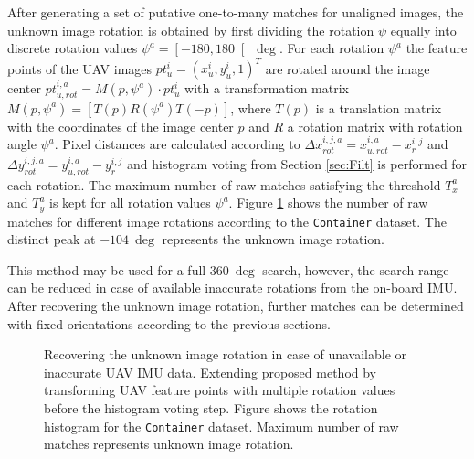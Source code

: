 After generating a set of putative one-to-many matches for unaligned images, the unknown image rotation is obtained by first dividing the rotation $\psi$ equally into discrete rotation values $\psi^a = \left[ -180, 180 \right[ \SI{}{\deg}$.
For each rotation $\psi^a$ the feature points of the UAV images $pt_{u}^i = (x_{u}^i , y_{u}^i , 1)^T$ are rotated around the image center $pt_{u,rot}^{i,a} = M(p,\psi^a) \cdot pt_{u}^i$ with a transformation matrix $M(p,\psi^a) = \left[ T(p) R(\psi^a) T(-p) \right]$, where $T(p)$ is a translation matrix with the coordinates of the image center $p$ and $R$ a rotation matrix with rotation angle $\psi^a$. 
Pixel distances are calculated according to $\Delta x_{rot}^{i,j,a} = x_{u,rot}^{i,a} - x_{r}^{i,j} $ and $ \Delta y_{rot}^{i,j,a} = y_{u,rot}^{i,a} - y_{r}^{i,j}$ and histogram voting from Section \ref{sec:Filt} is performed for each rotation.
The maximum number of raw matches satisfying the threshold $T_{x}^a$ and $T_{y}^a$ is kept for all rotation values $\psi^a$. 
Figure \ref{fig:img_rot} shows the number of raw matches for different image rotations according to the \texttt{Container} dataset.
The distinct peak at $\SI{-104}{\deg}$ represents the unknown image rotation. 

This method may be used for a full $\SI{360}{\deg}$ search, however, the search range can be reduced in case of available inaccurate rotations from the on-board IMU.
After recovering the unknown image rotation, further matches can be determined with fixed orientations according to the previous sections.

\begin{figure}[tbp]
    \centering
	\caption{Recovering the unknown image rotation in case of unavailable or inaccurate UAV IMU data. Extending proposed method by transforming UAV feature points with multiple rotation values before the histogram voting step. Figure shows the rotation histogram for the \texttt{Container} dataset. Maximum number of raw matches represents unknown image rotation.}
    \label{fig:img_rot}
\end{figure}

